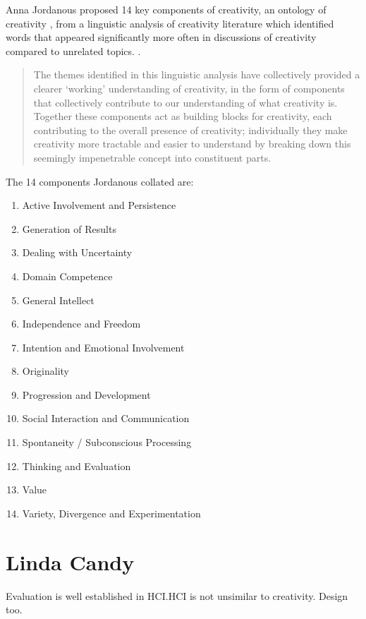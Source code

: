 Anna Jordanous proposed 14 key components of creativity, an ontology of creativity \citep[p.104-120]{Jordanous2012}, from a linguistic analysis of creativity literature which identified words that appeared significantly more often in discussions of creativity compared to unrelated topics. \citep[p.120]{Jordanous2012}.

\begin{quote}
  The themes identified in this linguistic analysis have collectively provided a clearer ‘working’ understanding of creativity, in the form of components that collectively contribute to our understanding of what creativity is. Together these components act as building blocks for creativity, each contributing to the overall presence of creativity; individually they make creativity more tractable and easier to understand by breaking down this seemingly impenetrable concept into constituent parts. \citep[p.120]{Jordanous2012}
\end{quote}

The 14 components Jordanous collated are: \citep[p.118-120]{Jordanous2012}
\begin{enumerate}
  \item Active Involvement and Persistence
  \item Generation of Results
  \item Dealing with Uncertainty
  \item Domain Competence
  \item General Intellect
  \item Independence and Freedom
  \item Intention and Emotional Involvement
  \item Originality
  \item Progression and Development
  \item Social Interaction and Communication
  \item Spontaneity / Subconscious Processing
  \item Thinking and Evaluation
  \item Value
  \item Variety, Divergence and Experimentation
\end{enumerate}


\section{Linda Candy}

Evaluation is well established in HCI.\@ HCI is not unsimilar to creativity. Design too.

